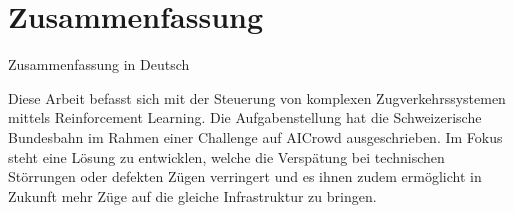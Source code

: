%
%

\thispagestyle{empty}
\chapter*{Zusammenfassung}\label{chap.zusammenfassung}
Zusammenfassung in Deutsch

Diese Arbeit befasst sich mit der Steuerung von komplexen Zugverkehrssystemen mittels Reinforcement Learning.
Die Aufgabenstellung hat die Schweizerische Bundesbahn im Rahmen einer Challenge auf AICrowd ausgeschrieben.
Im Fokus steht eine Lösung zu entwicklen, welche die Verspätung bei technischen Störrungen oder defekten Zügen verringert und es ihnen zudem ermöglicht in Zukunft mehr Züge auf die gleiche Infrastruktur zu bringen.







